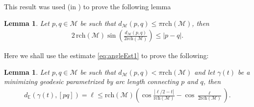 \documentclass{article}
\newtheorem{lemma}[theorem]{Lemma}
\newcommand{\M}{\mathcal{M}}
\newcommand{\rch}{\mathrm{rch}}
\begin{document}
This result was used (in \cite{attali:hal-00201055,TangentVar}) to prove the following lemma 
\begin{lemma}
\label{lem:TightMetricDist} 
Let $p,q \in \M $ be such that $d_\M (p,q) \leq \pi \rch(\M)$, then
\begin{align}
2 \, \rch(\M) \sin \left(\frac{ d_\M (p,q)}{2\rch(\M)} \right)\leq |p-q|.
\nonumber
\end{align}
\end{lemma} 

Here we shall use the estimate \eqref{eq:angleEst1} to prove the following:
\begin{lemma}
\label{Lem:Orthogonal_distance} 
Let $p,q \in \M $ be such that $d_\M (p,q) <\pi \rch(\M)$ and let $\gamma(t)$ be a minimizing geodesic parametrized by arc length connecting $p$ and $q$, then
\begin{align}
d_\mathbb{E}(\gamma(t) , [pq]) =\ell \leq \rch(\M)
 \left (\cos \frac{|\ell /2-t| } {\rch(\M)}  -\cos \frac{\ell} {2 \rch(\M)}\right ).
\nonumber
\end{align}
\end{lemma} 
\end{document}
